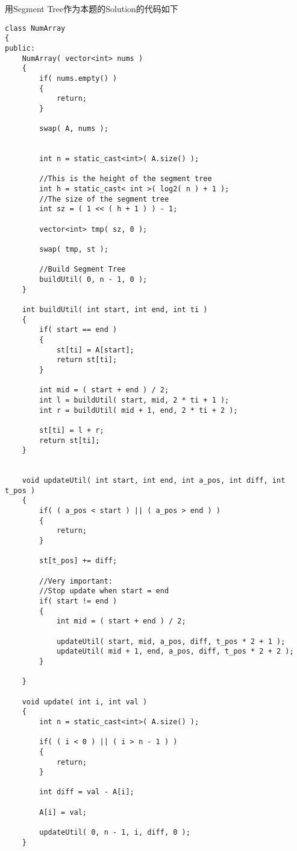 用Segment Tree作为本题的Solution的代码如下
\begin{lstlisting}[style=customc, caption={Solution Code With Segment Tree}]
class NumArray
{
public:
    NumArray( vector<int> nums )
    {
        if( nums.empty() )
        {
            return;
        }

        swap( A, nums );


        int n = static_cast<int>( A.size() );

        //This is the height of the segment tree
        int h = static_cast< int >( log2( n ) + 1 );
        //The size of the segment tree
        int sz = ( 1 << ( h + 1 ) ) - 1;

        vector<int> tmp( sz, 0 );

        swap( tmp, st );

        //Build Segment Tree
        buildUtil( 0, n - 1, 0 );
    }

    int buildUtil( int start, int end, int ti )
    {
        if( start == end )
        {
            st[ti] = A[start];
            return st[ti];
        }

        int mid = ( start + end ) / 2;
        int l = buildUtil( start, mid, 2 * ti + 1 );
        int r = buildUtil( mid + 1, end, 2 * ti + 2 );

        st[ti] = l + r;
        return st[ti];
    }


    void updateUtil( int start, int end, int a_pos, int diff, int t_pos )
    {
        if( ( a_pos < start ) || ( a_pos > end ) )
        {
            return;
        }

        st[t_pos] += diff;

        //Very important:
        //Stop update when start = end
        if( start != end )
        {
            int mid = ( start + end ) / 2;

            updateUtil( start, mid, a_pos, diff, t_pos * 2 + 1 );
            updateUtil( mid + 1, end, a_pos, diff, t_pos * 2 + 2 );
        }

    }

    void update( int i, int val )
    {
        int n = static_cast<int>( A.size() );

        if( ( i < 0 ) || ( i > n - 1 ) )
        {
            return;
        }

        int diff = val - A[i];

        A[i] = val;

        updateUtil( 0, n - 1, i, diff, 0 );
    }


\end{lstlisting}
